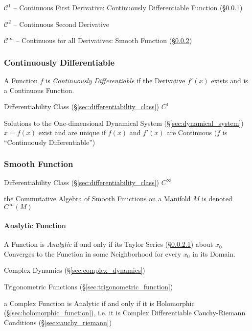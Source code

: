 $\mathcal{C}^1$ -- Continuous First Derivative: Continuously Differentiable
Function (\S\ref{sec:continuously_differentiable})

$\mathcal{C}^2$ -- Continuous Second Derivative

$\mathcal{C}^\infty$ -- Continuous for all Derivatives: Smooth Function
(\S\ref{sec:smooth_function})



\subsubsection{Continuously Differentiable}
\label{sec:continuously_differentiable}

A Function $f$ is \emph{Continuously Differentiable} if the Derivative $f'(x)$
exists and is a Continuous Function.

Differentiability Class (\S\ref{sec:differentiability_class}) $C^1$

Solutions to the One-dimensional Dynamical System
(\S\ref{sec:dynamical_system}) $\dot{x} = f(x)$ exist and are unique if $f(x)$
and $f'(x)$ are Continuous ($f$ is ``Continuously Differentiable'')



\subsubsection{Smooth Function}\label{sec:smooth_function}

Differentiability Class (\S\ref{sec:differentiability_class}) $C^{\infty}$

the Commutative Algebra of Smooth Functions on a Manifold $M$ is denoted
$C^\infty(M)$ %



\paragraph{Analytic Function}\label{sec:analytic_function}\hfill

A Function is \emph{Analytic} if and only if its Taylor Series
(\S\ref{sec:analytic_function}) about $x_0$ Converges to the Function in some
Neighborhood for every $x_0$ in its Domain.

Complex Dynamics (\S\ref{sec:complex_dynamics})

Trigonometric Functions (\S\ref{sec:trigonometric_function})

a Complex Function is Analytic if and only if it is Holomorphic
(\S\ref{sec:holomorphic_function}), i.e. it is Complex Differentiable \fist
Cauchy-Riemann Conditions (\S\ref{sec:cauchy_riemann})


